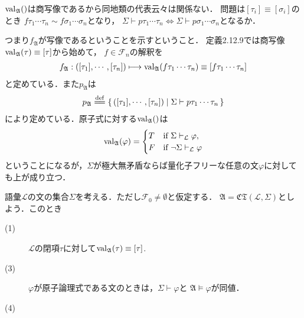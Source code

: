 	\begin{screen}
		\begin{thm}[定義2.12.9の正当性の検証]
			$\operatorname{val}_{\mathfrak{A}}()$は商写像であるから同地類の代表云々は関係ない．
			問題は$[\tau_{i}] \equiv [\sigma_{i}]$のとき
			$f\tau_{1}\cdots\tau_{n} \sim f\sigma_{1}\cdots\sigma_{n}$となり，
			$\Sigma \vdash p\tau_{1}\cdots\tau_{n} \Longleftrightarrow 
			\Sigma \vdash p\sigma_{1}\cdots\sigma_{n}$となるか．
		\end{thm}
	\end{screen}
	
	つまり$f_{\mathfrak{A}}$が写像であるということを示すということ．
	定義2.12.9では商写像$\operatorname{val}_{\mathfrak{A}}(\tau) \equiv [\tau]$から始めて，
	$f \in \mathcal{F}_{n}$の解釈を
	\begin{align}
		f_{\mathfrak{A}}:
		([\tau_{1}],\cdots,[\tau_{n}]) \longmapsto
		\operatorname{val}_{\mathfrak{A}}(f\tau_{1}\cdots\tau_{n})
		\equiv [f\tau_{1}\cdots\tau_{n}]
	\end{align}
	と定めている．また$p_{\mathfrak{A}}$は
	\begin{align}
		p_{\mathfrak{A}} \defeq \Set{([\tau_{1}],\cdots,[\tau_{n}])}{
		\Sigma \vdash p\tau_{1}\cdots\tau_{n}}
	\end{align}
	により定めている．原子式に対する$\operatorname{val}_{\mathfrak{A}}()$は
	\begin{align}
		\operatorname{val}_{\mathfrak{A}}(\varphi) = 
		\begin{cases}
			T &\mbox{if } \Sigma \vdash_{{\scriptsize \mathcal{L}}} \varphi, \\
			F &\mbox{if } \neg\Sigma \vdash_{{\scriptsize \mathcal{L}}} \varphi
		\end{cases}
	\end{align}
	ということになるが，$\Sigma$が極大無矛盾ならば量化子フリーな任意の文$\varphi$に対しても上が成り立つ．
	
	\begin{screen}
		\begin{thm}[補題2.12.10]
			語彙$\mathcal{L}$の文の集合$\Sigma$を考える．ただし$\mathcal{F}_{0} \neq \emptyset$と仮定する．
			$\mathfrak{A} = \mathfrak{CT}(\mathcal{L},\Sigma)$としよう．このとき
			\begin{description}
				\item[(1)] $\mathcal{L}$の閉項$\tau$に対して$\operatorname{val}_{\mathfrak{A}}(\tau) \equiv [\tau]$.
				\item[(3)] $\varphi$が原子論理式である文のときは，$\Sigma \vdash \varphi$と
					$\mathfrak{A} \models \varphi$が同値．
				\item[(4)] 
			\end{description}
		\end{thm}
	\end{screen}
	
